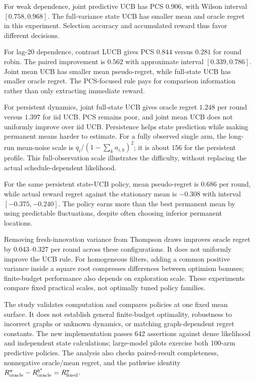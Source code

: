 For weak dependence, joint predictive UCB has PCS $0.906$, with Wilson interval $[0.758,0.968]$. The full-variance state UCB has smaller mean and oracle regret in this experiment. Selection accuracy and accumulated reward thus favor different decisions.

For lag-20 dependence, contrast LUCB gives PCS $0.844$ versus $0.281$ for round robin. The paired improvement is $0.562$ with approximate interval $[0.339,0.786]$. Joint mean UCB has smaller mean pseudo-regret, while full-state UCB has smaller oracle regret. The PCS-focused rule pays for comparison information rather than only extracting immediate reward.

For persistent dynamics, joint full-state UCB gives oracle regret $1.248$ per round versus $1.397$ for iid UCB. PCS remains poor, and joint mean UCB does not uniformly improve over iid UCB. Persistence helps state prediction while making permanent means harder to estimate. For a fully observed single arm, the long-run mean-noise scale is $q_i/(1-\sum_k a_{i,k})^2$; it is about 156 for the persistent profile. This full-observation scale illustrates the difficulty, without replacing the actual schedule-dependent likelihood.

For the same persistent state-UCB policy, mean pseudo-regret is $0.686$ per round, while actual reward regret against the stationary mean is $-0.308$ with interval $[-0.375,-0.240]$. The policy earns more than the best permanent mean by using predictable fluctuations, despite often choosing inferior permanent locations.

Removing fresh-innovation variance from Thompson draws improves oracle regret by 0.043--0.327 per round across these configurations. It does not uniformly improve the UCB rule. For homogeneous filters, adding a common positive variance inside a square root compresses differences between optimism bonuses; finite-budget performance also depends on exploration scale. These experiments compare fixed practical scales, not optimally tuned policy families.



The study validates computation and compares policies at one fixed mean surface. It does not establish general finite-budget optimality, robustness to incorrect graphs or unknown dynamics, or matching graph-dependent regret constants. The new implementation passes 642 assertions against dense likelihood and independent state calculations; large-model pilots exercise both 100-arm predictive policies. The analysis also checks paired-result completeness, nonnegative oracle/mean regret, and the pathwise identity $R_{\rm oracle}^{\pi}-R_{\rm oracle}^{b^*}=R_{\rm fixed}^{\pi}$.




